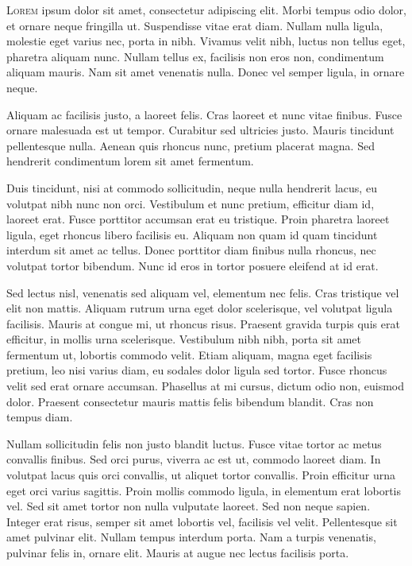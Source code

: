 \documentclass[a4paper]{article}
\begin{document}
\lettrine{L}{orem} ipsum dolor sit amet, consectetur adipiscing elit. Morbi tempus odio dolor, et ornare neque fringilla ut. Suspendisse vitae erat diam. Nullam nulla ligula, molestie eget varius nec, porta in nibh. Vivamus velit nibh, luctus non tellus eget, pharetra aliquam nunc. Nullam tellus ex, facilisis non eros non, condimentum aliquam mauris. Nam sit amet venenatis nulla. Donec vel semper ligula, in ornare neque.

Aliquam ac facilisis justo, a laoreet felis. Cras laoreet et nunc vitae finibus. Fusce ornare malesuada est ut tempor. Curabitur sed ultricies justo. Mauris tincidunt pellentesque nulla. Aenean quis rhoncus nunc, pretium placerat magna. Sed hendrerit condimentum lorem sit amet fermentum.

Duis tincidunt, nisi at commodo sollicitudin, neque nulla hendrerit lacus, eu volutpat nibh nunc non orci. Vestibulum et nunc pretium, efficitur diam id, laoreet erat. Fusce porttitor accumsan erat eu tristique. Proin pharetra laoreet ligula, eget rhoncus libero facilisis eu. Aliquam non quam id quam tincidunt interdum sit amet ac tellus. Donec porttitor diam finibus nulla rhoncus, nec volutpat tortor bibendum. Nunc id eros in tortor posuere eleifend at id erat.

Sed lectus nisl, venenatis sed aliquam vel, elementum nec felis. Cras tristique vel elit non mattis. Aliquam rutrum urna eget dolor scelerisque, vel volutpat ligula facilisis. Mauris at congue mi, ut rhoncus risus. Praesent gravida turpis quis erat efficitur, in mollis urna scelerisque. Vestibulum nibh nibh, porta sit amet fermentum ut, lobortis commodo velit. Etiam aliquam, magna eget facilisis pretium, leo nisi varius diam, eu sodales dolor ligula sed tortor. Fusce rhoncus velit sed erat ornare accumsan. Phasellus at mi cursus, dictum odio non, euismod dolor. Praesent consectetur mauris mattis felis bibendum blandit. Cras non tempus diam.

Nullam sollicitudin felis non justo blandit luctus. Fusce vitae tortor ac metus convallis finibus. Sed orci purus, viverra ac est ut, commodo laoreet diam. In volutpat lacus quis orci convallis, ut aliquet tortor convallis. Proin efficitur urna eget orci varius sagittis. Proin mollis commodo ligula, in elementum erat lobortis vel. Sed sit amet tortor non nulla vulputate laoreet. Sed non neque sapien. Integer erat risus, semper sit amet lobortis vel, facilisis vel velit. Pellentesque sit amet pulvinar elit. Nullam tempus interdum porta. Nam a turpis venenatis, pulvinar felis in, ornare elit. Mauris at augue nec lectus facilisis porta. 
\end{document}
